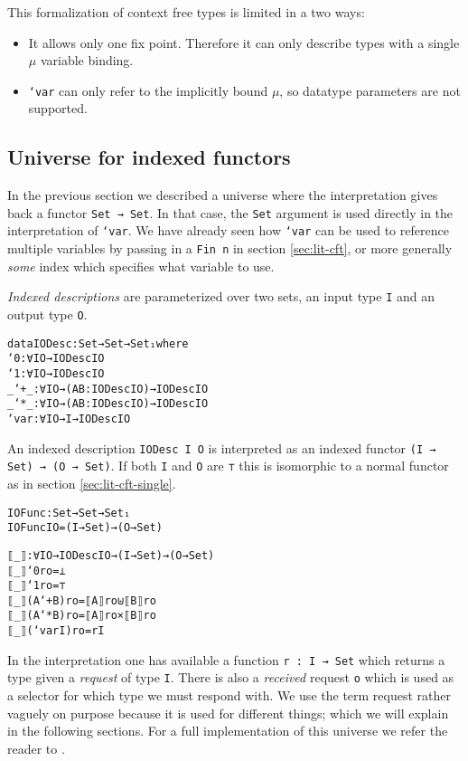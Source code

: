 This formalization of context free types is limited in a two ways:
\begin{itemize}
\item It allows only one fix point. Therefore it can only describe types
with a single $μ$ variable binding.
\item \texttt{`var} can only refer to the implicitly bound $μ$, so
  datatype parameters are not supported.
\end{itemize}

\subsection{Universe for indexed functors}
\label{sec:lit-indexed}

In the previous section we described a universe where the
interpretation gives back a functor \texttt{Set → Set}.
In that case, the \texttt{Set} argument is used directly in the
interpretation of \texttt{`var}.
We have already seen how \texttt{`var} can be used to reference
multiple variables by passing in a \texttt{Fin n} in section
\ref{sec:lit-cft}, or more generally \emph{some} index which specifies
what variable to use.

\emph{Indexed descriptions} are parameterized over two sets, an input
type \texttt{I} and an output type \texttt{O}.

\begin{alltt}
data IODesc : Set → Set → Set₁ where
  `0 : ∀{I O} → IODesc I O
  `1 : ∀{I O} → IODesc I O
  _`+_ : ∀{I O} → (A B : IODesc I O) → IODesc I O
  _`*_ : ∀{I O} → (A B : IODesc I O) → IODesc I O
  `var : ∀{I O} → I → IODesc I O
\end{alltt}

An indexed description \texttt{IODesc I O} is interpreted as an
indexed functor \texttt{(I → Set) → (O → Set)}.
If both \texttt{I} and \texttt{O} are \texttt{⊤} this is isomorphic to
a normal functor as in section \ref{sec:lit-cft-single}.

\begin{alltt}
IOFunc : Set → Set → Set₁
IOFunc I O = (I → Set) → (O → Set)

⟦_⟧ : ∀{I O} → IODesc I O → (I → Set) → (O → Set)
⟦_⟧ `0 r o = ⊥
⟦_⟧ `1 r o = ⊤
⟦_⟧ (A `+ B) r o = ⟦ A ⟧ r o ⊎ ⟦ B ⟧ r o
⟦_⟧ (A `* B) r o = ⟦ A ⟧ r o × ⟦ B ⟧ r o
⟦_⟧ (`var I) r o = r I
\end{alltt}

In the interpretation one has available a function \texttt{r : I →
  Set} which returns a type given a \emph{request} of type
\texttt{I}.
There is also a \emph{received} request \texttt{o} which is used as a
selector for which type we must respond with.
We use the term request rather vaguely on purpose because it is used
for different things; which we will explain in the following sections.
For a full implementation of this universe we refer the reader to
\cite{loeh11}.

